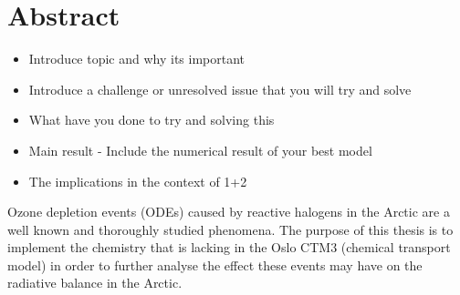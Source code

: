 \chapter*{Abstract}


\begin{itemize}
    \item Introduce topic and why its important
    \item Introduce a challenge or unresolved issue that you will try and solve
    \item What have you done to try and solving this
    \item Main result - Include the numerical result of your best model
    \item The implications in the context of 1+2
\end{itemize}

Ozone depletion events (ODEs) caused by reactive halogens in the Arctic are a well known and thoroughly studied phenomena. The purpose of this thesis is to implement the chemistry that is lacking in the Oslo CTM3 (chemical transport model) in order to further analyse the effect these events may have on the radiative balance in the Arctic. 
\cleardoublepage